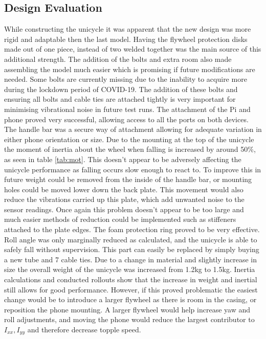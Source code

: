 \documentclass[twoside,twocolumn,12pt]{article}
\begin{document}
\subsection{Design Evaluation}
While constructing the unicycle it was apparent that the new design was more rigid and adaptable then the last model. Having the flywheel protection disks made out of one piece, instead of two welded together was the main source of this additional strength. The addition of the bolts and extra room also made assembling the model much easier which is promising if future modifications are needed. Some bolts are currently missing due to the inability to acquire more during the lockdown period of COVID-19. The addition of these bolts and ensuring all bolts and cable ties are attached tightly is very important for minimising vibrational noise in future test runs.
\newline
The attachment of the Pi and phone proved very successful, allowing access to all the ports on both devices. The handle bar was a secure way of attachment allowing for adequate variation in either phone orientation or size. Due to the mounting at the top of the unicycle the moment of inertia about the wheel when falling is increased by around 50\%, as seen in table \ref{tab:mot}. This doesn't appear to be adversely affecting the unicycle performance as falling occurs slow enough to react to. To improve this in future weight could be removed from the inside of the handle bar, or mounting holes could be moved lower down the back plate. This movement would also reduce the vibrations carried up this plate, which add unwanted noise to the sensor readings. Once again this problem doesn't appear to be too large and much easier methods of reduction could be implemented such as stiffeners attached to the plate edges.
\newline
The foam protection ring proved to be very effective. Roll angle was only marginally reduced as calculated, and the unicycle is able to safely fall without supervision. This part can easily be replaced by simply buying a new tube \cite{foam} and 7 cable ties.
\newline
Due to a change in material and slightly increase in size the overall weight of the unicycle was increased from 1.2kg to 1.5kg. Inertia calculations and conducted rollouts show that the increase in weight and inertial still allows for good performance. However, if this proved problematic the easiest change would be to introduce a larger flywheel as there is room in the casing, or reposition the phone mounting. A larger flywheel would help increase yaw and roll adjustments, and moving the phone would reduce the largest contributor to $I_{xx},I_{yy}$ and therefore decrease topple speed.  
\end{document}
